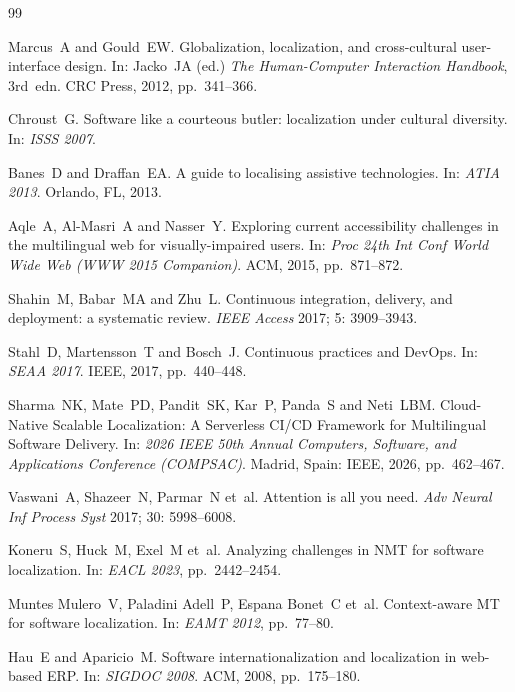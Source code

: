 \documentclass[pdflatex,sn-mathphys-num]{sn-jnl}
\begin{document}
\begin{thebibliography}{99}

Marcus~A and Gould~EW.
\newblock Globalization, localization, and cross-cultural user-interface design.
\newblock In: Jacko~JA (ed.) \emph{The Human-Computer Interaction Handbook}, 3rd~edn. CRC Press, 2012, pp.~341--366.

Chroust~G.
\newblock Software like a courteous butler: localization under cultural diversity.
\newblock In: \emph{ISSS 2007}.

Banes~D and Draffan~EA.
\newblock A guide to localising assistive technologies.
\newblock In: \emph{ATIA 2013}. Orlando, FL, 2013.

Aqle~A, Al-Masri~A and Nasser~Y.
\newblock Exploring current accessibility challenges in the multilingual web for visually-impaired users.
\newblock In: \emph{Proc 24th Int Conf World Wide Web (WWW 2015 Companion)}. ACM, 2015, pp.~871--872.

Shahin~M, Babar~MA and Zhu~L.
\newblock Continuous integration, delivery, and deployment: a systematic review.
\newblock \emph{IEEE Access} 2017; 5: 3909--3943.

Stahl~D, Martensson~T and Bosch~J.
\newblock Continuous practices and DevOps.
\newblock In: \emph{SEAA 2017}. IEEE, 2017, pp.~440--448.

Sharma~NK, Mate~PD, Pandit~SK, Kar~P, Panda~S and Neti~LBM.
\newblock Cloud-Native Scalable Localization: A Serverless CI/CD Framework for Multilingual Software Delivery.
\newblock In: \emph{2026 IEEE 50th Annual Computers, Software, and Applications Conference (COMPSAC)}. Madrid, Spain: IEEE, 2026, pp.~462--467.

Vaswani~A, Shazeer~N, Parmar~N et~al.
\newblock Attention is all you need.
\newblock \emph{Adv Neural Inf Process Syst} 2017; 30: 5998--6008.

Koneru~S, Huck~M, Exel~M et~al.
\newblock Analyzing challenges in NMT for software localization.
\newblock In: \emph{EACL 2023}, pp.~2442--2454.

Muntes Mulero~V, Paladini Adell~P, Espana Bonet~C et~al.
\newblock Context-aware MT for software localization.
\newblock In: \emph{EAMT 2012}, pp.~77--80.

Hau~E and Aparicio~M.
\newblock Software internationalization and localization in web-based ERP.
\newblock In: \emph{SIGDOC 2008}. ACM, 2008, pp.~175--180.


\end{thebibliography}
\end{document}
